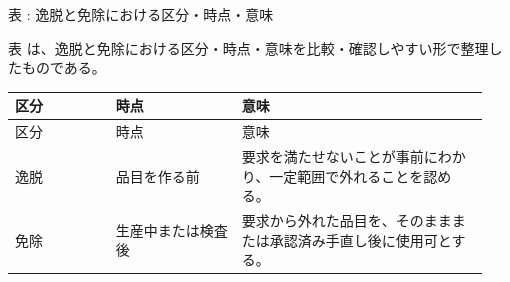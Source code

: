\par\smallskip\noindent{}\label{tab:ch08-05}表 \thetable: 逸脱と免除における区分・時点・意味\par\smallskip
表 \thetable は、逸脱と免除における区分・時点・意味を比較・確認しやすい形で整理したものである。\par\smallskip
\begin{longtable}{p{0.20\linewidth}p{0.25\linewidth}p{0.49\linewidth}}\toprule
区分 & 時点 & 意味 \\ \midrule
\endfirsthead\toprule
区分 & 時点 & 意味 \\ \midrule
\endhead
逸脱 & 品目を作る前 & 要求を満たせないことが事前にわかり、一定範囲で外れることを認める。 \\
免除 & 生産中または検査後 & 要求から外れた品目を、そのまままたは承認済み手直し後に使用可とする。 \\
\bottomrule\end{longtable}
